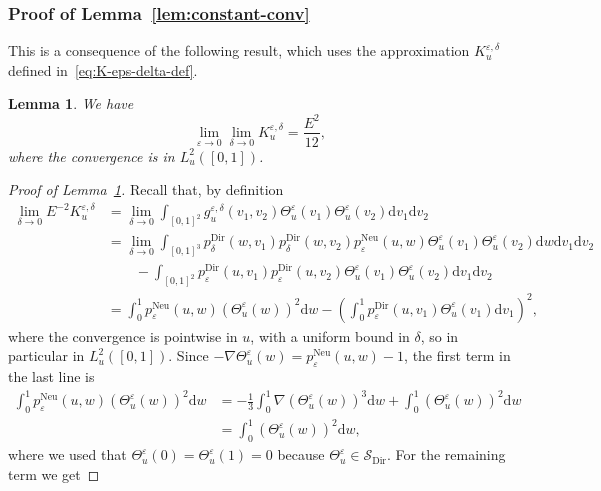 \documentclass[10pt]{amsart}
\newtheorem{lemm}[theo]{Lemma}\newtheorem{prop}[theo]{Proposition}\newtheorem{coro}[theo]{Corollary}\newtheorem{conj}[theo]{Conjecture}
\theoremstyle{definition}\newtheorem{defi}[theo]{Definition}\newtheorem{rema}[theo]{Remark}\newtheorem{exam}[theo]{Example}\newtheorem{exem}[theo]{Example}\newtheorem{nota}[theo]{Notation}
\DeclareMathOperator{\Dir}{Dir}
\DeclareMathOperator{\Neu}{Neu}
\newcommand{\mc}[1]{{\mathcal #1}}
\renewcommand{\mc}[1]{{\mathcal #1}}
\newcommand{\SD}{\ensuremath{\mc S_{\Dir}}}
\newcommand*{\dd}{\mathrm{d}}
\newcommand*{\dv}{\dd v}
\newcommand*{\dw}{\dd w}
\begin{document}
\subsubsection{Proof of Lemma~\ref{lem:constant-conv}}

This is a consequence of the following result, which uses the approximation $K_u^{\varepsilon,\delta}$ defined in~\eqref{eq:K-eps-delta-def}.

\begin{lemm}\label{lem:Kdelta}
We have
\[
\lim_{\varepsilon \rightarrow 0} \lim_{\delta \rightarrow 0} K^{\varepsilon, \delta}_u = \frac{E^2}{12},
\]
where the convergence is in $L_u^2 ([0, 1])$.
\end{lemm}

\begin{proof}[Proof of Lemma~\ref{lem:Kdelta}]
Recall that, by definition
\begin{align*}
\lim_{\delta \rightarrow 0} E^{- 2} K^{\varepsilon, \delta}_u & =
\lim_{\delta \rightarrow 0} \int_{[0, 1]^2} g^{\varepsilon, \delta}_u (v_1, v_2) \Theta^{\varepsilon}_u (v_1) \Theta^{\varepsilon}_u (v_2) \dv_1 \dv_2\\
& = \lim_{\delta \rightarrow 0} \int_{[0, 1]^3} p^{\Dir}_{\delta} (w, v_1) p^{\Dir}_{\delta} (w, v_2) p^{\Neu}_{\varepsilon} (u, w) \Theta^{\varepsilon}_u (v_1) \Theta^{\varepsilon}_u (v_2) \dw \dv_1 \dv_2\\
&\qquad - \int_{[0, 1]^2} p^{\Dir}_{\varepsilon} (u, v_1) p^{\Dir}_{\varepsilon} (u, v_2)
\Theta^{\varepsilon}_u (v_1) \Theta^{\varepsilon}_u (v_2) \dv_1 \dv_2\\
& = \int_0^1 p^{\Neu}_{\varepsilon} (u, w) (\Theta^{\varepsilon}_u (w))^2 \dw - \left(\int_0^1 p^{\Dir}_{\varepsilon} (u, v_1) \Theta^{\varepsilon}_u (v_1) \dv_1 \right)^2,
\end{align*}
where the convergence is pointwise in $u$, with a uniform bound in $\delta$, so in particular in $L_u^2 ([0, 1])$. Since $- \nabla
\Theta^{\varepsilon}_u (w) = p^{\Neu}_{\varepsilon} (u, w) - 1$, the first term in the last line is
\begin{align*}
\int_0^1 p^{\Neu}_{\varepsilon} (u, w) (\Theta^{\varepsilon}_u (w))^2 \dw& =
- \frac{1}{3} \int_0^1 \nabla (\Theta^{\varepsilon}_u (w))^3 \dw +
\int_0^1 (\Theta^{\varepsilon}_u (w))^2 \dw \\ & = \int_0^1 (\Theta^{\varepsilon}_u (w))^2 \dw,
\end{align*}
where we used that $\Theta^{\varepsilon}_u (0) = \Theta^{\varepsilon}_u (1) = 0$ because $\Theta^\varepsilon_u \in \SD$. For the remaining term we get

\end{proof}
\end{document}
